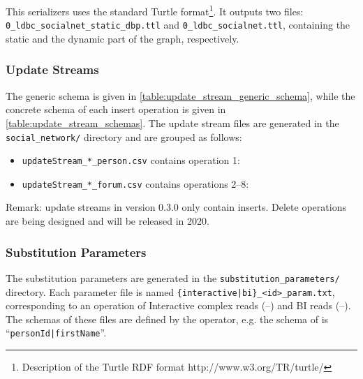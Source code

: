 This serializers uses the standard Turtle format\footnote{Description of
the Turtle RDF format http://www.w3.org/TR/turtle/}. It outputs
two files: \texttt{0\_ldbc\_socialnet\_static\_dbp.ttl} and \texttt{0\_ldbc\_socialnet.ttl}, containing the static and the dynamic part of the graph, respectively.

\subsubsection{Update Streams}



The generic schema is given in \autoref{table:update_stream_generic_schema}, while the concrete schema of each insert operation is given in \autoref{table:update_stream_schemas}.
The update stream files are generated in the \texttt{social\_network/} directory and are grouped as follows:

\begin{itemize}
	\item \texttt{updateStream\_*\_person.csv} contains operation 1: 
	\item \texttt{updateStream\_*\_forum.csv} contains operations 2--8: %
\end{itemize}

Remark: update streams in version 0.3.0 only contain inserts. Delete operations are being designed and will be released in 2020.

\subsubsection{Substitution Parameters}

The substitution parameters are generated in the \texttt{substitution\_parameters/} directory.
Each parameter file is named \texttt{\{interactive|bi\}\_<id>\_param.txt}, corresponding to an operation of
Interactive complex reads (--) and
BI reads (--).
The schemas of these files are defined by the operator, e.g. the schema of  is ``\texttt{personId|firstName}''.

